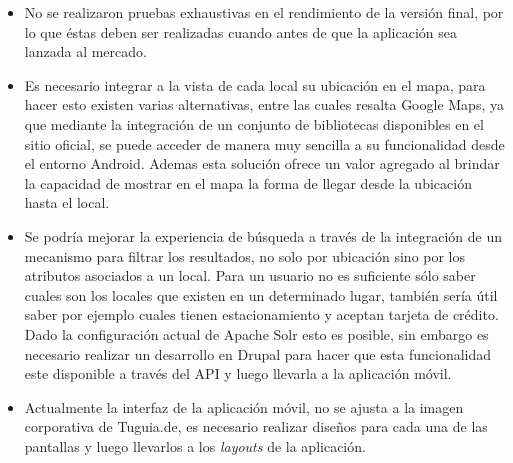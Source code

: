 \begin{itemize}
\item No se realizaron pruebas exhaustivas en el rendimiento de la versión final, por lo que
éstas deben ser realizadas cuando antes de que la aplicación sea lanzada al mercado.
\item Es necesario integrar a la vista de cada local su ubicación en el mapa, para hacer esto existen varias alternativas, entre las cuales resalta Google Maps, ya que mediante la integración de un conjunto de bibliotecas disponibles en el sitio oficial, se puede acceder de manera muy sencilla a su funcionalidad desde el entorno Android. Ademas esta solución ofrece un valor agregado al brindar la capacidad de mostrar en el mapa la forma de llegar desde la ubicación hasta el local.
\item Se podría mejorar la experiencia de búsqueda a través de la integración de un mecanismo para filtrar los resultados, no solo por ubicación sino por los atributos asociados a un local. Para un usuario no es suficiente sólo saber cuales son los locales que existen en un determinado lugar, también sería útil saber por ejemplo cuales tienen estacionamiento y aceptan tarjeta de crédito. Dado la configuración actual de Apache Solr esto es posible, sin embargo es necesario realizar un desarrollo en Drupal para hacer que esta funcionalidad este disponible a través del API y luego llevarla a la aplicación móvil. 
\item Actualmente la interfaz de la aplicación móvil, no se ajusta a la imagen corporativa de Tuguia.de, es necesario realizar diseños para cada una de las pantallas y luego llevarlos a los \textit{layouts} de la aplicación.

\end{itemize}
